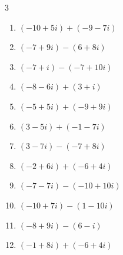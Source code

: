 \begin{multicols}{3}
\begin{enumerate}
        \phantom{$\displaystyle =7-i$}

  \item $\displaystyle (-10+5i) + (-9-7i)$

        \phantom{$\displaystyle =-19-2i$}

  \item $\displaystyle (-7+9i) - (6+8i)$

        \phantom{$\displaystyle =-13+i$}

  \item $\displaystyle (-7+i) - (-7+10i)$

        \phantom{$\displaystyle =-9i$}

\columnbreak %

\resetques

  \item $\displaystyle (-8-6i) + (3+i)$

        \phantom{$\displaystyle =-5-5i$}

  \item $\displaystyle (-5+5i) + (-9+9i)$

        \phantom{$\displaystyle =-14+14i$}

  \item $\displaystyle (3-5i) + (-1-7i)$

        \phantom{$\displaystyle =2-12i$}

  \item $\displaystyle (3-7i) - (-7+8i)$

        \phantom{$\displaystyle =10-15i$}

  \item $\displaystyle (-2+6i) + (-6+4i)$

        \phantom{$\displaystyle =-8+10i$}

  \item $\displaystyle (-7-7i) - (-10+10i)$

        \phantom{$\displaystyle =3-17i$}

  \item $\displaystyle (-10+7i) - (1-10i)$

        \phantom{$\displaystyle =-11+17i$}

  \item $\displaystyle (-8+9i) - (6-i)$

        \phantom{$\displaystyle =-14+10i$}

  \item $\displaystyle (-1+8i) + (-6+4i)$

        \phantom{$\displaystyle =-7+12i$}


\end{enumerate}
\end{multicols}
